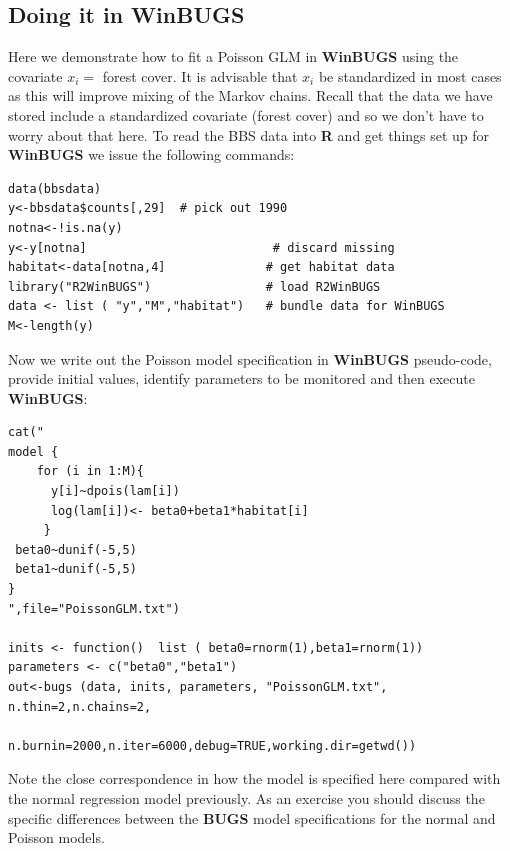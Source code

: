 \subsection{Doing it in WinBUGS}

Here we demonstrate how to fit a Poisson GLM in {\bf WinBUGS} using the
covariate $x_{i} =$ forest cover. It is advisable that $x_i$ be
standardized in most cases as this will improve mixing of the Markov
chains. Recall that the data we have stored include a standardized
covariate (forest cover) and so we don't have to worry about that
here.  To read the BBS data into {\bf R} and get things set up for
{\bf WinBUGS}
we issue the following commands:
{\small
\begin{verbatim}
data(bbsdata)
y<-bbsdata$counts[,29]  # pick out 1990
notna<-!is.na(y)
y<-y[notna]                          # discard missing
habitat<-data[notna,4]              # get habitat data
library("R2WinBUGS")                # load R2WinBUGS
data <- list ( "y","M","habitat")   # bundle data for WinBUGS
M<-length(y)
\end{verbatim}
}
Now we write out the Poisson model specification in {\bf WinBUGS}
pseudo-code, provide initial values, identify parameters to be
monitored and then execute {\bf WinBUGS}:
{\small
\begin{verbatim}
cat("
model {
    for (i in 1:M){
      y[i]~dpois(lam[i])
      log(lam[i])<- beta0+beta1*habitat[i]
     }
 beta0~dunif(-5,5)
 beta1~dunif(-5,5)
}
",file="PoissonGLM.txt")

inits <- function()  list ( beta0=rnorm(1),beta1=rnorm(1))
parameters <- c("beta0","beta1")
out<-bugs (data, inits, parameters, "PoissonGLM.txt", n.thin=2,n.chains=2,
                n.burnin=2000,n.iter=6000,debug=TRUE,working.dir=getwd())
\end{verbatim}
}
Note the close correspondence in how the model is
specified here compared with the normal regression model
previously. As an exercise you should discuss the specific differences
between the {\bf BUGS} model specifications for the normal and Poisson
models. 

